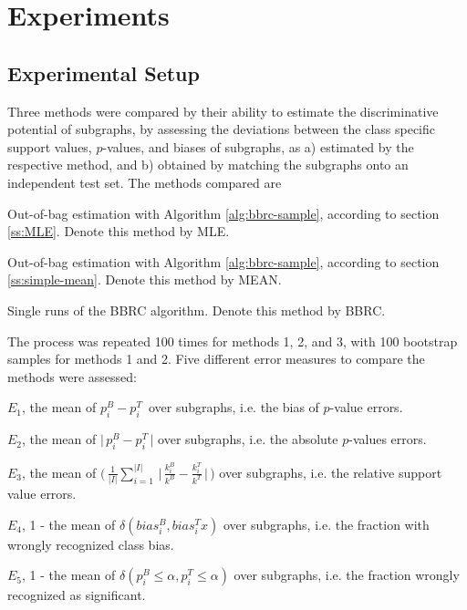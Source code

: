 \documentclass{article}
\begin{document}
\section{Experiments}
\label{s:Experiments}

\subsection{Experimental Setup} 
\label{ss:Error-estimation} 
Three methods were compared by their ability to estimate the discriminative
potential of subgraphs, by assessing the deviations between the class specific
support values, $p$-values, and biases of subgraphs, as a) estimated by the respective
method, and b) obtained by matching the subgraphs onto an independent test set.
The methods compared are
\begin{enumerate*} 
  \item Out-of-bag estimation with Algorithm \ref{alg:bbrc-sample}, according
    to section \ref{ss:MLE}. Denote this method by MLE.
  \item Out-of-bag estimation with Algorithm \ref{alg:bbrc-sample}, according
    to section \ref{ss:simple-mean}. Denote this method by MEAN.
  \item Single runs of the BBRC algorithm. Denote this method by BBRC.
\end{enumerate*}

The process was repeated 100 times for methods 1, 2, and 3, with 100 bootstrap samples for methods 1 
and 2. Five different error measures to compare the methods were assessed:
\begin{enumerate*}
  \item $E_1$, the mean of     $ p^B_i -p^T_i \,$                                                                                    over subgraphs, i.e. the bias of $p$-value errors.
  \item $E_2$, the mean of     $ \Big|\,p^B_i -p^T_i \,\Big|$                                                                        over subgraphs, i.e. the absolute $p$-values errors.
  \item $E_3$, the mean of     $ \Big(\,\frac{1}{|I|} \sum_{i=1}^{|I|} \,\Big|\,\frac{k^B_i}{k^B} - \frac{k^T_i}{k^T} \,\Big|\,\Big)$ over subgraphs, i.e. the relative support value errors.
  \item $E_4$, 1 - the mean of $ \delta(bias^B_i, bias^T_ix)$                                                                        over subgraphs, i.e. the fraction with wrongly recognized class bias.
  \item $E_5$, 1 - the mean of $ \delta(p^B_i \le \alpha, p^T_i \le \alpha)$                                                         over subgraphs, i.e. the fraction wrongly recognized as significant.
\end{enumerate*}
\end{document}
